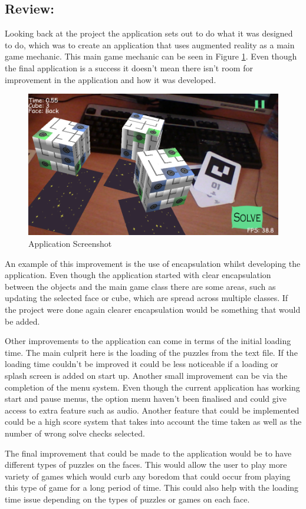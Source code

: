 \subsection{Review:}\label{sc:review}

Looking back at the project the application sets out to do what it was designed to do, which was to create an application that uses augmented reality as a main game mechanic.
This main game mechanic can be seen in Figure \ref{fig:screent shot}.
Even though the final application is a success it doesn't mean there isn't room for improvement in the application and how it was developed.

\begin{figure}[ht!]
	\label{fig:screent shot}
	\centering
	\includegraphics[width=\textwidth]{images/screenshot3.PNG}
	\caption{Application Screenshot}
\end{figure}

An example of this improvement is the use of encapsulation whilst developing the application.
Even though the application started with clear encapsulation between the objects and the main game class there are some areas, such as updating the selected face or cube, which are spread across multiple classes.
If the project were done again clearer encapsulation would be something that would be added.

Other improvements to the application can come in terms of the initial loading time.
The main culprit here is the loading of the puzzles from the text file.
If the loading time couldn't be improved it could be less noticeable if a loading or splash screen is added on start up.
Another small improvement can be via the completion of the menu system.
Even though the current application has working start and pause menus, the option menu haven't been finalised and could give access to extra feature such as audio.
Another feature that could be implemented could be a high score system that takes into account the time taken as well as the number of wrong solve checks selected.

The final improvement that could be made to the application would be to have different types of puzzles on the faces.
This would allow the user to play more variety of games which would curb any boredom that could occur from playing this type of game for a long period of time.
This could also help with the loading time issue depending on the types of puzzles or games on each face.